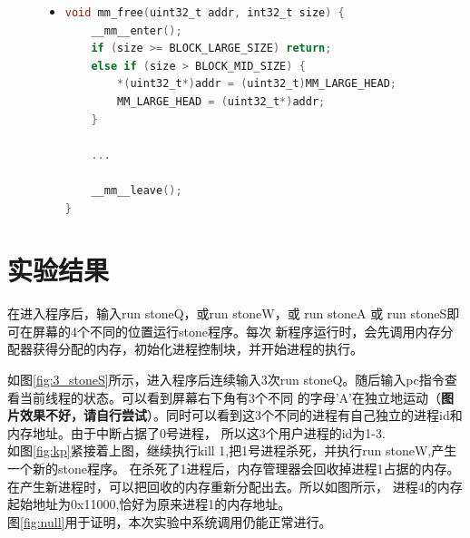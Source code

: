 \documentclass[a4paper]{article}
\begin{document}
\begin{figure}
\begin{itemize}
\item[] \begin{lstlisting}[language=C, label=lst:mm_free, caption=内存分配器的free操作实现]
void mm_free(uint32_t addr, int32_t size) {
    __mm__enter();
    if (size >= BLOCK_LARGE_SIZE) return;
    else if (size > BLOCK_MID_SIZE) {
        *(uint32_t*)addr = (uint32_t)MM_LARGE_HEAD;
        MM_LARGE_HEAD = (uint32_t*)addr;
    } 
    
    ...

    __mm__leave();
}
\end{lstlisting}
\end{itemize}
\end{figure}
\section{实验结果}
    在进入程序后，输入run stoneQ，或run stoneW，或 run stoneA 或 run stoneS即可在屏幕的4个不同的位置运行stone程序。每次
    新程序运行时，会先调用内存分配器获得分配的内存，初始化进程控制块，并开始进程的执行。

    如图\ref{fig:3_stoneS}所示，进入程序后连续输入3次run stoneQ。随后输入pc指令查看当前线程的状态。可以看到屏幕右下角有3个不同
    的字母'A'在独立地运动（\textbf{图片效果不好，请自行尝试}）。同时可以看到这3个不同的进程有自己独立的进程id和内存地址。由于中断占据了0号进程，
    所以这3个用户进程的id为1-3.\\ 

    如图\ref{fig:kp}紧接着上图，继续执行kill 1,把1号进程杀死，并执行run stoneW,产生一个新的stone程序。
    在杀死了1进程后，内存管理器会回收掉进程1占据的内存。在产生新进程时，可以把回收的内存重新分配出去。所以如图所示，
    进程4的内存起始地址为0x11000,恰好为原来进程1的内存地址。\\ 

    图\ref{fig:null}用于证明，本次实验中系统调用仍能正常进行。
    
\end{document}

